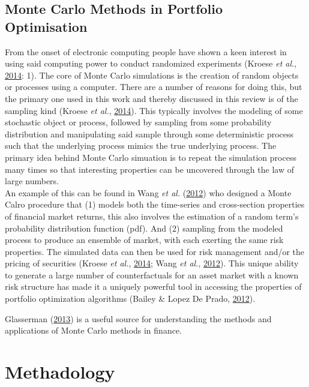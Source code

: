 \documentclass[11pt,preprint, authoryear]{elsarticle}
\numberwithin{equation}{section}
\numberwithin{figure}{section}
\numberwithin{table}{section}
\begin{document}
\hypertarget{monte-carlo-methods-in-portfolio-optimisation}{%
\subsection{Monte Carlo Methods in Portfolio
Optimisation}\label{monte-carlo-methods-in-portfolio-optimisation}}

From the onset of electronic computing people have shown a keen interest
in using said computing power to conduct randomized experiments (Kroese
\emph{et al.}, \protect\hyperlink{ref-kroese2014}{2014}: 1). The core of
Monte Carlo simulations is the creation of random objects or processes
using a computer. There are a number of reasons for doing this, but the
primary one used in this work and thereby discussed in this review is of
the sampling kind (Kroese \emph{et al.},
\protect\hyperlink{ref-kroese2014}{2014}). This typically involves the
modeling of some stochastic object or process, followed by sampling from
some probability distribution and manipulating said sample through some
deterministic process such that the underlying process mimics the true
underlying process. The primary idea behind Monte Carlo simuation is to
repeat the simulation process many times so that interesting properties
can be uncovered through the law of large numbers.\\

An example of this can be found in Wang \emph{et al.}
(\protect\hyperlink{ref-wang2012}{2012}) who designed a Monte Calro
procedure that (1) models both the time-series and cross-section
properties of financial market returns, this also involves the
estimation of a random term's probability distribution function (pdf).
And (2) sampling from the modeled process to produce an ensemble of
market, with each exerting the same risk properties. The simulated data
can then be used for risk management and/or the pricing of securities
(Kroese \emph{et al.}, \protect\hyperlink{ref-kroese2014}{2014}; Wang
\emph{et al.}, \protect\hyperlink{ref-wang2012}{2012}). This unique
ability to generate a large number of counterfactuals for an asset
market with a known risk structure has made it a uniquely powerful tool
in accessing the properties of portfolio optimization algorithms (Bailey
\& Lopez De Prado, \protect\hyperlink{ref-lopez2012}{2012}).

Glasserman (\protect\hyperlink{ref-glasserman2013}{2013}) is a useful
source for understanding the methods and applications of Monte Carlo
methods in finance.

\hypertarget{methadology}{%
\section{Methadology}\label{methadology}}
\end{document}
